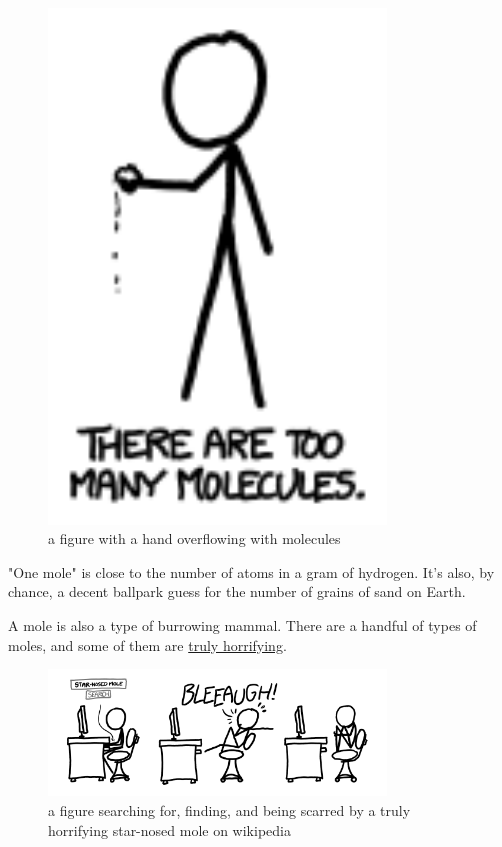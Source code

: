 \begin{figure}[!htbp]
\centering
\includegraphics[scale=0.5, max width=0.8\textwidth]{imgs/a/4/moles_too_many.png}
\caption{a figure with a hand overflowing with molecules}
\end{figure}

{"One mole" is close to the number of atoms in a gram of hydrogen. It’s also, by chance, a decent ballpark guess for the number of grains of sand on Earth.}

{A mole is also a type of burrowing mammal. There are a handful of types of moles, and some of them are \href{http://en.wikipedia.org/wiki/File:Condylura.jpg}{truly horrifying}.}

\begin{figure}[!htbp]
\centering
\includegraphics[scale=0.5, max width=0.8\textwidth]{imgs/a/4/moles_star_nosed.png}
\caption{a figure searching for, finding, and being scarred by a truly horrifying star-nosed mole on wikipedia}
\end{figure}

